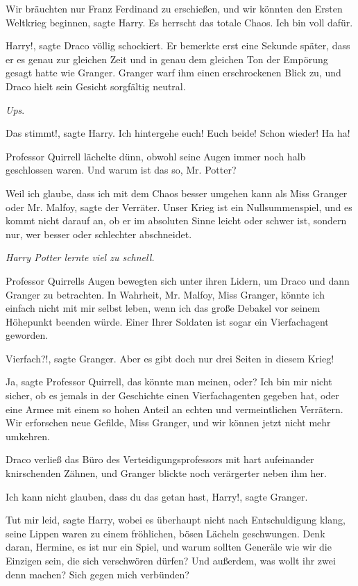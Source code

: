 \glqq{}Wir bräuchten nur Franz Ferdinand zu erschießen, und wir könnten den
Ersten Weltkrieg beginnen\grqq{}, sagte Harry. \glqq{}Es herrscht das totale
Chaos. Ich bin voll dafür.\grqq{}

\glqq{}Harry!\grqq{}, sagte Draco völlig schockiert. Er bemerkte erst eine
Sekunde später, dass er es genau zur gleichen Zeit und in genau dem gleichen Ton
der Empörung gesagt hatte wie Granger. Granger warf ihm einen erschrockenen
Blick zu, und Draco hielt sein Gesicht sorgfältig neutral.

\emph{Ups}.

\glqq{}Das stimmt!\grqq{}, sagte Harry. \glqq{}Ich hintergehe euch! Euch beide!
Schon wieder! Ha ha!\grqq{}

Professor Quirrell lächelte dünn, obwohl seine Augen immer noch halb geschlossen
waren. \glqq{}Und warum ist das so, Mr. Potter?\grqq{}

\glqq{}Weil ich glaube, dass ich mit dem Chaos besser umgehen kann als Miss
Granger oder Mr. Malfoy\grqq{}, sagte der Verräter. \glqq{}Unser Krieg ist ein
Nullsummenspiel, und es kommt nicht darauf an, ob er im absoluten Sinne leicht
oder schwer ist, sondern nur, wer besser oder schlechter abschneidet.\grqq{}

\emph{Harry Potter lernte viel zu schnell.}

Professor Quirrells Augen bewegten sich unter ihren Lidern, um Draco und dann
Granger zu betrachten. \glqq{}In Wahrheit, Mr. Malfoy, Miss Granger, könnte ich
einfach nicht mit mir selbst leben, wenn ich das große Debakel vor seinem
Höhepunkt beenden würde. Einer Ihrer Soldaten ist sogar ein Vierfachagent
geworden.\grqq{}

\glqq{}Vierfach?!\grqq{}, sagte Granger. \glqq{}Aber es gibt doch nur drei Seiten
in diesem Krieg!\grqq{}

\glqq{}Ja\grqq{}, sagte Professor Quirrell, \glqq{}das könnte man meinen, oder?
Ich bin mir nicht sicher, ob es jemals in der Geschichte einen Vierfachagenten
gegeben hat, oder eine Armee mit einem so hohen Anteil an echten und
vermeintlichen Verrätern. Wir erforschen neue Gefilde, Miss Granger, und wir
können jetzt nicht mehr umkehren.\grqq{}

Draco verließ das Büro des Verteidigungsprofessors mit hart aufeinander
knirschenden Zähnen, und Granger blickte noch verärgerter neben ihm her.

\glqq{}Ich kann nicht glauben, dass du das getan hast, Harry!\grqq{}, sagte
Granger.

\glqq{}Tut mir leid\grqq{}, sagte Harry, wobei es überhaupt nicht nach
Entschuldigung klang, seine Lippen waren zu einem fröhlichen, bösen Lächeln
geschwungen. \glqq{}Denk daran, Hermine, es ist nur ein Spiel, und warum sollten
Generäle wie wir die Einzigen sein, die sich verschwören dürfen? Und außerdem,
was wollt ihr zwei denn machen? Sich gegen mich verbünden?\grqq{}

